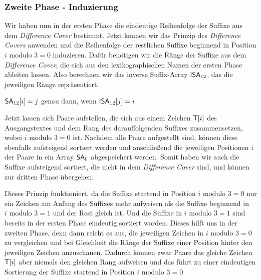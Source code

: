 \subsubsection{Zweite Phase - Induzierung}
\label{dc3:algorithmus:phase2}

Wir haben nun in der ersten Phase die eindeutige Reihenfolge der Suffixe aus dem \emph{Difference Cover} bestimmt. Jetzt können wir das Prinzip des \emph{Difference Covers} anwenden und die Reihenfolge der restlichen Suffixe beginnend in Position $i \text{ modulo } 3 = 0$ induzieren. Dafür benötigen wir die Ränge der Suffixe aus dem \emph{Difference Cover}, die sich aus den lexikographischen Namen der ersten Phase ableiten lassen. Also berechnen wir das inverse Suffix-Array $\isa_{12}$, das die jeweiligen Ränge repräsentiert.
\begin{center}
	$\sa_{12}[i] = j$ genau dann, wenn $\isa_{12}[j] = i$
\end{center}
Jetzt lassen sich Paare aufstellen, die sich aus einem Zeichen $\inputtext[i]$ des Aus\-gangs\-text\-es und dem Rang des darauffolgenden Suffixes zusammensetzen, wobei $i \text{ modulo } 3 = 0$ ist. Nachdem alle Paare aufgestellt sind, können diese ebenfalls aufsteigend sortiert werden und anschließend die jeweiligen Positionen $i$ der Paare in ein Array $\sa_0$ abgespeichert werden. Somit haben wir auch die Suffixe aufsteigend sortiert, die nicht in dem \emph{Difference Cover} sind, und können zur dritten Phase übergehen.

Dieses Prinzip funktioniert, da die Suffixe startend in Position $i \text{ modulo } 3 = 0$ nur ein Zeichen am Anfang des Suffixes mehr aufweisen als die Suffixe beginnend in $i \text{ modulo } 3 = 1$ und der Rest gleich ist. Und die Suffixe in $i \text{ modulo } 3 = 1$ sind bereits in der ersten Phase eindeutig sortiert worden. Dieses hilft uns in der zweiten Phase, denn dann reicht es aus, die jeweiligen Zeichen in $i \text{ modulo } 3 = 0$ zu vergleichen und bei Gleichheit die Ränge der Suffixe einer Position hinter den jeweiligen Zeichen anzuschauen. Dadurch können zwar Paare das gleiche Zeichen $\inputtext[i]$ aber niemals den gleichen Rang aufweisen und das führt zu einer eindeutigen Sortierung der Suffixe startend in Position $i \text{ modulo } 3 = 0$.